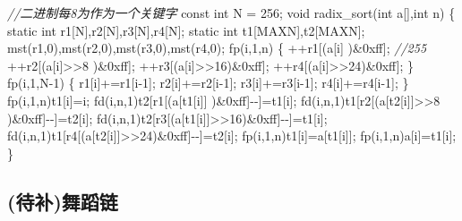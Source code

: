 \documentclass[
]{article}
\newenvironment{Shaded}{}{}
\newcommand{\AttributeTok}[1]{\textcolor[rgb]{0.49,0.56,0.16}{#1}}
\newcommand{\BaseNTok}[1]{\textcolor[rgb]{0.25,0.63,0.44}{#1}}
\newcommand{\CommentTok}[1]{\textcolor[rgb]{0.38,0.63,0.69}{\textit{#1}}}
\newcommand{\DataTypeTok}[1]{\textcolor[rgb]{0.56,0.13,0.00}{#1}}
\newcommand{\DecValTok}[1]{\textcolor[rgb]{0.25,0.63,0.44}{#1}}
\newcommand{\NormalTok}[1]{#1}
\begin{document}
\begin{Shaded}
\begin{Highlighting}[]
\CommentTok{//二进制每8为作为一个关键字}
\AttributeTok{const} \DataTypeTok{int}\NormalTok{ N = }\DecValTok{256}\NormalTok{;}
\DataTypeTok{void}\NormalTok{ radix\_sort(}\DataTypeTok{int}\NormalTok{ a[],}\DataTypeTok{int}\NormalTok{ n)}
\NormalTok{\{}
    \AttributeTok{static} \DataTypeTok{int}\NormalTok{ r1[N],r2[N],r3[N],r4[N];}
    \AttributeTok{static} \DataTypeTok{int}\NormalTok{ t1[MAXN],t2[MAXN];}
\NormalTok{    mst(r1,}\DecValTok{0}\NormalTok{),mst(r2,}\DecValTok{0}\NormalTok{),mst(r3,}\DecValTok{0}\NormalTok{),mst(r4,}\DecValTok{0}\NormalTok{);}
\NormalTok{    fp(i,}\DecValTok{1}\NormalTok{,n)}
\NormalTok{    \{}
\NormalTok{        ++r1[(a[i]    )\&}\BaseNTok{0xff}\NormalTok{]; }\CommentTok{//255}
\NormalTok{        ++r2[(a[i]\textgreater{}\textgreater{}}\DecValTok{8}\NormalTok{ )\&}\BaseNTok{0xff}\NormalTok{];}
\NormalTok{        ++r3[(a[i]\textgreater{}\textgreater{}}\DecValTok{16}\NormalTok{)\&}\BaseNTok{0xff}\NormalTok{];}
\NormalTok{        ++r4[(a[i]\textgreater{}\textgreater{}}\DecValTok{24}\NormalTok{)\&}\BaseNTok{0xff}\NormalTok{];}
\NormalTok{    \}}
\NormalTok{    fp(i,}\DecValTok{1}\NormalTok{,N{-}}\DecValTok{1}\NormalTok{)}
\NormalTok{    \{}
\NormalTok{        r1[i]+=r1[i{-}}\DecValTok{1}\NormalTok{];}
\NormalTok{        r2[i]+=r2[i{-}}\DecValTok{1}\NormalTok{];}
\NormalTok{        r3[i]+=r3[i{-}}\DecValTok{1}\NormalTok{];}
\NormalTok{        r4[i]+=r4[i{-}}\DecValTok{1}\NormalTok{];}
\NormalTok{    \}}
\NormalTok{    fp(i,}\DecValTok{1}\NormalTok{,n)t1[i]=i;}
\NormalTok{    fd(i,n,}\DecValTok{1}\NormalTok{)t2[r1[(a[t1[i]]    )\&}\BaseNTok{0xff}\NormalTok{]{-}{-}]=t1[i];}
\NormalTok{    fd(i,n,}\DecValTok{1}\NormalTok{)t1[r2[(a[t2[i]]\textgreater{}\textgreater{}}\DecValTok{8}\NormalTok{ )\&}\BaseNTok{0xff}\NormalTok{]{-}{-}]=t2[i];}
\NormalTok{    fd(i,n,}\DecValTok{1}\NormalTok{)t2[r3[(a[t1[i]]\textgreater{}\textgreater{}}\DecValTok{16}\NormalTok{)\&}\BaseNTok{0xff}\NormalTok{]{-}{-}]=t1[i];}
\NormalTok{    fd(i,n,}\DecValTok{1}\NormalTok{)t1[r4[(a[t2[i]]\textgreater{}\textgreater{}}\DecValTok{24}\NormalTok{)\&}\BaseNTok{0xff}\NormalTok{]{-}{-}]=t2[i];}
\NormalTok{    fp(i,}\DecValTok{1}\NormalTok{,n)t1[i]=a[t1[i]];}
\NormalTok{    fp(i,}\DecValTok{1}\NormalTok{,n)a[i]=t1[i];}
\NormalTok{\}}
\end{Highlighting}
\end{Shaded}

\hypertarget{ux5f85ux8865ux821eux8e48ux94fe}{%
\subsection{(待补)舞蹈链}\label{ux5f85ux8865ux821eux8e48ux94fe}}
\end{document}
